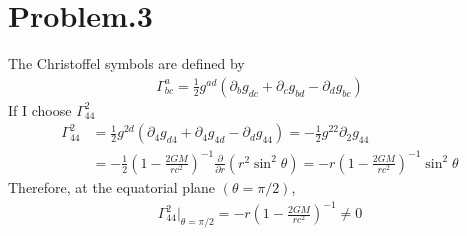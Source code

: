 \documentclass[12pt]{article}
\begin{document}
\begin{comment}
Now, by transforming into the coordinates of the first spaceship, the motion of the photon emitted at radial direction with the Schwarzschild metric is given by
\begin{align*}
\left(1 - \frac{2 G M}{r_1 c^2} \right) \frac{d r'}{d t'} = \pm c \left(1 - \frac{2 G M}{\left(1 - \frac{2 G M}{r_1 c^2} \right)^{1/2}c^2} \frac{1}{r'}\right)
\end{align*}
By integrating this differential equation, here,
\begin{align*}
\int_{r'_0}^{r'(t')} \frac{d r''}{\left(1 - \frac{r_d}{r''}\right)} = \pm c \left(1 - \frac{2 G M}{r_1 c^2} \right)^{-1} \int_{t_0}^{t'} dt''
\end{align*}
where the constant
\begin{gather*}
r_d = \frac{2 G M}{\left(1 - \frac{2 G M}{r_1 c^2} \right)^{1/2}c^2}
\end{gather*}
$\Leftrightarrow$
\begin{align*}
r_d \ln{|r'(t) - r_d|} + r'(t') - r_d \ln{|r'_0 - r_d|} - r'_0  = \pm c \left(1 - \frac{2 G M}{r_1 c^2} \right)^{-1} \left(t' - t'_0\right)
\end{align*}
$\Leftrightarrow$
\begin{align*}
t' - t'_0 = \pm \frac{1}{c} \left(1 - \frac{2 G M}{r_1 c^2} \right) \left(r_d \ln{\left| \frac{r'(t') - r_d}{r'_0 - r_d}\right|} + r'(t') - r'_0 \right)
\end{align*}
In the original coordinates, the worldline of the first spaceship is given by $x_{ss1}^{\mu} = \left(\lambda, r_1, 0, 0 \right)$. Thus, after the transformation,
\begin{gather*}
x_{ss1}^{\mu'} = \left(\left(1 - \frac{2 G M}{r_1 c^2} \right)^{- 1/2} \lambda, \left(1 - \frac{2 G M}{r_1 c^2} \right)^{1/2} r_1, 0, 0 \right)
\end{gather*}
???
\end{comment}

\section*{Problem.3}
The Christoffel symbols are defined by
\begin{gather*}
\Gamma^{a}_{bc} = \frac{1}{2} g^{ad} \left(\partial_{b} g_{dc} + \partial_{c} g_{bd} - \partial_{d} g_{bc}\right)
\end{gather*}
If I choose $\Gamma^{2}_{44}$
\begin{align*}
\Gamma^{2}_{44} &= \frac{1}{2} g^{2 d} \left(\partial_4 g_{d 4} + \partial_4 g_{4d} - \partial_{d} g_{44} \right) = - \frac{1}{2} g^{2 2} \partial_{2} g_{44}\\[1em]
&= - \frac{1}{2} \left(1 - \frac{2 G M}{r c^2} \right)^{-1} \frac{\partial}{\partial r} \left(r^2 \sin^2{\theta} \right) = - r \left(1 - \frac{2 G M}{r c^2} \right)^{-1} \sin^2{\theta}
\end{align*}
Therefore, at the equatorial plane $\left(\theta = \pi/2\right)$,
\begin{align*}
\Gamma^{2}_{44}\big|_{\theta = \pi/2} = - r \left(1 - \frac{2 G M}{r c^2} \right)^{-1} \neq 0
\end{align*}
\end{document}
